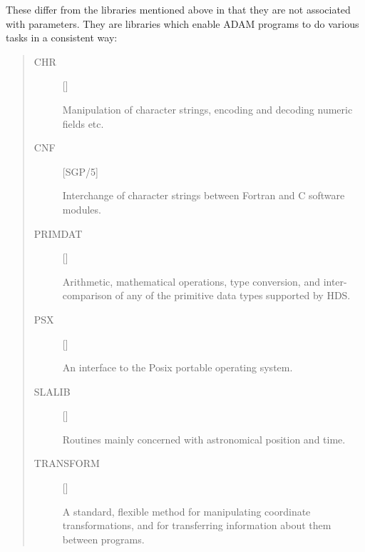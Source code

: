 These differ from the libraries mentioned above in that they are not associated
with parameters.
They are libraries which enable ADAM programs to do various tasks in a
consistent way:
\begin{quote}
\begin{description}
\item [CHR] \hfill []

 Manipulation of character strings, encoding and decoding numeric fields etc.

\item [CNF] \hfill [SGP/5]

 Interchange of character strings between Fortran and C software modules.

\item [PRIMDAT] \hfill []

 Arithmetic, mathematical operations, type conversion, and inter-comparison of
 any of the  primitive data types supported by HDS.

\item [PSX] \hfill []

  An interface to the Posix portable operating system.

\item [SLALIB] \hfill []

 Routines mainly concerned with astronomical position and time.

\item [TRANSFORM] \hfill []

 A standard, flexible method for manipulating coordinate transformations,
 and for transferring information about them between programs.

\end{description}
\end{quote}
